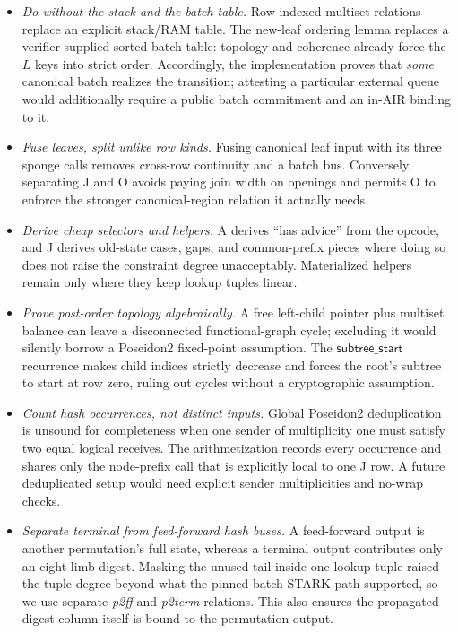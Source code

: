 \documentclass[11pt]{article}
\begin{document}
\begin{itemize}[nosep]
    \item \emph{Do without the stack and the batch table.} Row-indexed multiset relations replace an explicit stack/RAM table. The new-leaf ordering lemma replaces a verifier-supplied sorted-batch table: topology and coherence already force the $L$ keys into strict order. Accordingly, the implementation proves that \emph{some} canonical batch realizes the transition; attesting a particular external queue would additionally require a public batch commitment and an in-AIR binding to it.
    \item \emph{Fuse leaves, split unlike row kinds.} Fusing canonical leaf input with its three sponge calls removes cross-row continuity and a batch bus. Conversely, separating J and O avoids paying join width on openings and permits O to enforce the stronger canonical-region relation it actually needs.
    \item \emph{Derive cheap selectors and helpers.} A derives ``has advice'' from the opcode, and J derives old-state cases, gaps, and common-prefix pieces where doing so does not raise the constraint degree unacceptably. Materialized helpers remain only where they keep lookup tuples linear.
    \item \emph{Prove post-order topology algebraically.} A free left-child pointer plus multiset balance can leave a disconnected functional-graph cycle; excluding it would silently borrow a Poseidon2 fixed-point assumption. The $\mathsf{subtree\_start}$ recurrence makes child indices strictly decrease and forces the root's subtree to start at row zero, ruling out cycles without a cryptographic assumption.
    \item \emph{Count hash occurrences, not distinct inputs.} Global Poseidon2 deduplication is unsound for completeness when one sender of multiplicity one must satisfy two equal logical receives. The arithmetization records every occurrence and shares only the node-prefix call that is explicitly local to one J row. A future deduplicated setup would need explicit sender multiplicities and no-wrap checks.
    \item \emph{Separate terminal from feed-forward hash buses.} A feed-forward output is another permutation's full state, whereas a terminal output contributes only an eight-limb digest. Masking the unused tail inside one lookup tuple raised the tuple degree beyond what the pinned batch-STARK path supported, so we use separate \emph{p2ff} and \emph{p2term} relations. This also ensures the propagated digest column itself is bound to the permutation output.

\end{itemize}
\end{document}
